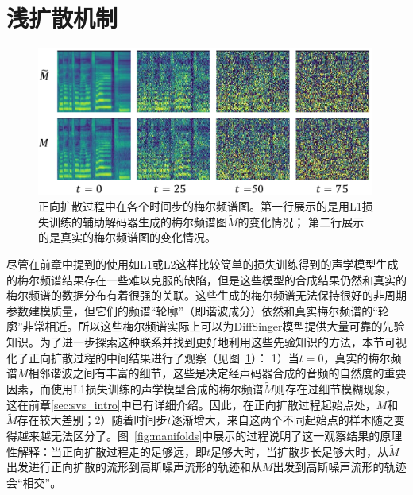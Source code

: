\section{浅扩散机制}
\label{sec:shallow_mechanism}
\begin{figure}[htbp]
    \centering
    \includegraphics[width=0.99\textwidth,]{figure/svs/fake_real_mel.pdf}
    \caption{正向扩散过程中在各个时间步的梅尔频谱图。第一行展示的是用L1损失训练的辅助解码器生成的梅尔频谱图$\widetilde{M}$的变化情况； 第二行展示的是真实的梅尔频谱图的变化情况。}
    \label{fig:fake_real_mels_diffusion}
\end{figure}
尽管在前章中提到的使用如L1或L2这样比较简单的损失训练得到的声学模型生成的梅尔频谱结果存在一些难以克服的缺陷，但是这些模型的合成结果仍然和真实的梅尔频谱的数据分布有着很强的关联。这些生成的梅尔频谱无法保持很好的非周期参数建模质量，但它们的频谱``轮廓''（即谐波成分）依然和真实梅尔频谱的``轮廓''非常相近。所以这些梅尔频谱实际上可以为DiffSinger模型提供大量可靠的先验知识。为了进一步探索这种联系并找到更好地利用这些先验知识的方法，本节可视化了正向扩散过程的中间结果进行了观察（见图~\ref{fig:fake_real_mels_diffusion}）：
1）当$t = 0$，真实的梅尔频谱$M$相邻谐波之间有丰富的细节，这些是决定经声码器合成的音频的自然度的重要因素，而使用L1损失训练的声学模型合成的梅尔频谱$\widetilde{M}$则存在过细节模糊现象，这在前章\ref{sec:svs_intro}中已有详细介绍。因此，在正向扩散过程起始点处，$M$和$\widetilde{M}$存在较大差别；2）随着时间步$t$逐渐增大，来自这两个不同起始点的样本随之变得越来越无法区分了。图~\ref{fig:manifolds}中展示的过程说明了这一观察结果的原理性解释：当正向扩散过程走的足够远，即$t$足够大时，当扩散步长足够大时，从$\widetilde{M}$出发进行正向扩散的流形到高斯噪声流形的轨迹和从$M$出发到高斯噪声流形的轨迹会``相交''。
